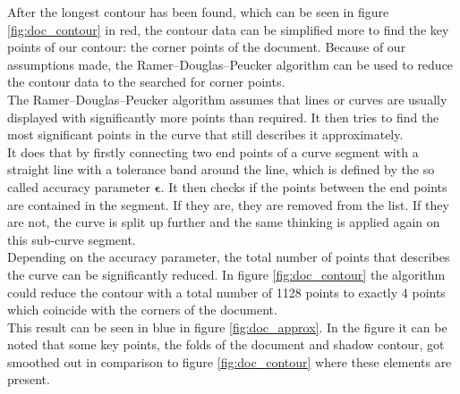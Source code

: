 After the longest contour has been found, which can be seen in figure \ref{fig:doc_contour} in red, the contour data can be simplified more to find the key points of our contour: the corner points of the document. Because of our assumptions made, the Ramer–Douglas–Peucker algorithm can be used to reduce the contour data to the searched for corner points.\\ 

The Ramer–Douglas–Peucker algorithm assumes that lines or curves are usually displayed with significantly more points than required. It then tries to find the most significant points in the curve that still describes it approximately. \cite{rdp-algo}\\

It does that by firstly connecting two end points of a curve segment with a straight line with a tolerance band around the line, which is defined by the so called accuracy parameter {\large $\bm{\epsilon}$}. It then checks if the points between the end points are contained in the segment. If they are, they are removed from the list. If they are not, the curve is split up further and the same thinking is applied again on this sub-curve segment. \cite{contour} \cite{rdp-algo}\\

Depending on the accuracy parameter, the total number of points that describes the curve can be significantly reduced. \cite{rdp-algo} In figure \ref{fig:doc_contour} the algorithm could reduce the contour with a total number of 1128 points to exactly 4 points which coincide with the corners of the document.\\


This result can be seen in blue in figure \ref{fig:doc_approx}. In the figure it can be noted that some key points, the folds of the document and shadow contour, got smoothed out in comparison to figure \ref{fig:doc_contour} where these elements are present.

